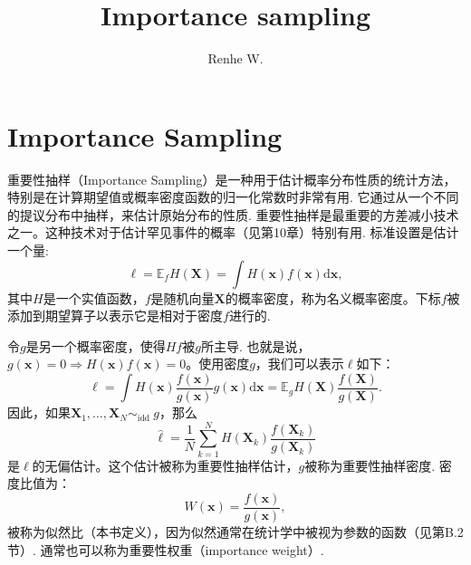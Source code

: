 \documentclass[UTF8,12pt,twoside]{ctexart}
\title{Importance sampling}
\author{Renhe W.}
\date{ }
\numberwithin{equation}{section}%
\begin{document}
	\pagestyle{empty} %
		
	\maketitle
	\tableofcontents%
	\listoffigures%
	\listoftables%
	\newpage
	\kaishu
	
	\restoregeometry
	\pagestyle{headings} %
	
		
	\section{Importance Sampling}
	重要性抽样（Importance Sampling）是一种用于估计概率分布性质的统计方法，特别是在计算期望值或概率密度函数的归一化常数时非常有用. 它通过从一个不同的提议分布中抽样，来估计原始分布的性质. 重要性抽样是最重要的方差减小技术之一。这种技术对于估计罕见事件的概率（见第10章）特别有用. 标准设置是估计一个量:
	\begin{equation}
		\ell=\mathbb{E}_f H(\mathbf{X})=\int H(\mathbf{x}) f(\mathbf{x}) \mathrm{d} \mathbf{x},
	\end{equation}
	其中$H$是一个实值函数，$f$是随机向量$\mathbf{X}$的概率密度，称为名义概率密度。下标$f$被添加到期望算子以表示它是相对于密度$f$进行的.
	
	令$g$是另一个概率密度，使得$H f$被$g$所主导. 也就是说，$g(\mathbf{x})=0 \Rightarrow H(\mathbf{x}) f(\mathbf{x})=0$。使用密度$g$，我们可以表示$\ell$如下：
	\begin{equation}
		\ell=\int H(\mathbf{x}) \frac{f(\mathbf{x})}{g(\mathbf{x})} g(\mathbf{x}) \mathrm{d} \mathbf{x}=\mathbb{E}_g H(\mathbf{X}) \frac{f(\mathbf{X})}{g(\mathbf{X})}.
	\end{equation}
	因此，如果$\mathbf{X}_1, \ldots, \mathbf{X}_N \sim_{\text {idd }} g$，那么
	\begin{equation}
		\widehat{\ell}=\frac{1}{N} \sum_{k=1}^N H\left(\mathbf{X}_k\right) \frac{f\left(\mathbf{X}_k\right)}{g\left(\mathbf{X}_k\right)}
	\end{equation}
	是$\ell$的无偏估计。这个估计被称为重要性抽样估计，$g$被称为重要性抽样密度. 密度比值为：
	\begin{equation}
		W(\mathbf{x})=\frac{f(\mathbf{x})}{g(\mathbf{x})},
	\end{equation}
	被称为似然比（本书定义），因为似然通常在统计学中被视为参数的函数（见第B.2节）. 通常也可以称为重要性权重（importance weight）.
	
\end{document}
